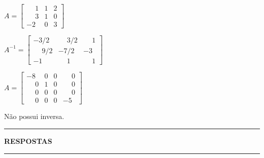 \documentclass[12pt]{exam}
\begin{document}
\begin{exercicio}
      $
    A =\begin{bmatrix}
        \phantom{-} 1 & 1 & 2\\
        \phantom{-} 3 & 1 & 0\\
        -2 & 0 & 3
    \end{bmatrix}
    $
    \begin{solucao}
        $
        A^{-1} =\begin{bmatrix}
            -3/2 & \phantom{-} 3/2 & \phantom{-} 1\\
            \phantom{-} 9/2 & -7/2 & -3\\
            -1 & \phantom{-} 1 & \phantom{-} 1
        \end{bmatrix}
        $
    \end{solucao}
\end{exercicio}

\begin{exercicio}\label{matrizinversafim}
    $
    A =\begin{bmatrix}
        -8 & 0 & 0 & \phantom{-} 0\\
        \phantom{-} 0 & 1 & 0 & \phantom{-} 0\\
        \phantom{-} 0 & 0 & 0 & \phantom{-} 0\\
        \phantom{-} 0 & 0 & 0 & -5
    \end{bmatrix}
    $
    \begin{solucao}
        Não possui inversa.
    \end{solucao}
\end{exercicio}

\newpage
{}
\hrule
\begin{center}
{\large\bf RESPOSTAS}
\end{center}
\hrule

\end{document}
